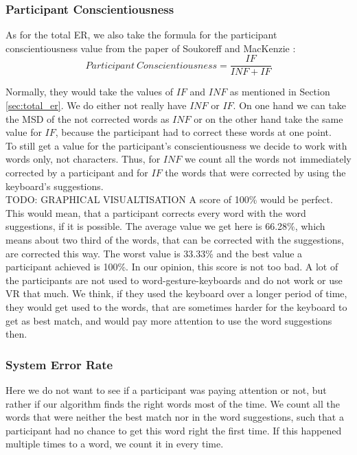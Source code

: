 \subsubsection{Participant Conscientiousness}
As for the total ER, we also take the formula for the participant conscientiousness value from the paper of Soukoreff and MacKenzie \cite{10.1145/642611.642632}:
\begin{equation}
    Participant\ Conscientiousness = \frac{IF}{INF + IF}
\end{equation}

Normally, they would take the values of $IF$ and $INF$ as mentioned in Section \ref{sec:total_er}. We do either not really have $INF$ or $IF$. On one hand we can take the MSD of the not corrected words as $INF$ or on the other hand take the same value for $IF$, because the participant had to correct these words at one point.\\
To still get a value for the participant's conscientiousness we decide to work with words only, not characters. Thus, for $INF$ we count all the words not immediately corrected by a participant and for $IF$ the words that were corrected by using the keyboard's suggestions.\\
TODO: GRAPHICAL VISUALTISATION
A score of 100\% would be perfect. This would mean, that a participant corrects every word with the word suggestions, if it is possible. The average value we get here is 66.28\%, which means about two third of the words, that can be corrected with the suggestions, are corrected this way. The worst value is 33.33\% and the best value a participant achieved is 100\%. In our opinion, this score is not too bad. A lot of the participants are not used to word-gesture-keyboards and do not work or use VR that much. We think, if they used the keyboard over a longer period of time, they would get used to the words, that are sometimes harder for the keyboard to get as best match, and would pay more attention to use the word suggestions then.

\subsubsection{System Error Rate}
Here we do not want to see if a participant was paying attention or not, but rather if our algorithm finds the right words most of the time. We count all the words that were neither the best match nor in the word suggestions, such that a participant had no chance to get this word right the first time. If this happened multiple times to a word, we count it in every time.
\iffalse
\begin{figure}[H]
    \makebox[\textwidth][c]{
        \centering
        \subbottom[with characters\label{fig:error_system:error_system1}]{\texttt{[image: system\_error2\_1.png]}}\hspace{-3.0em}
        \subbottom[with words\label{fig:error_system:error_system2}]{\texttt{[image: system\_error2\_2.png]}}
    }
    \caption{percentage of characters/words that were not found by the system neither as best match nor as suggestion}
    \label{fig:error_system}
\end{figure}
\fi


